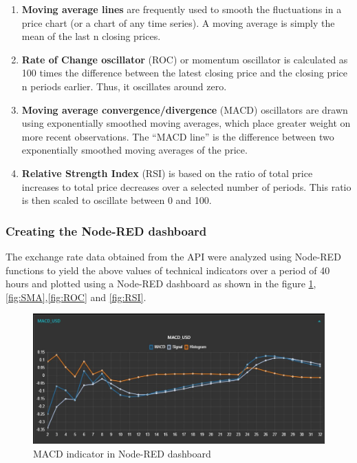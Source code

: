 \begin{enumerate}[itemsep=-1.7mm]
\item \textbf{Moving average lines} are frequently used to smooth the fluctuations in a price chart (or a chart of any time series). A moving average is simply the mean of the last n closing prices.

\item \textbf{Rate of Change oscillator} (ROC) or momentum oscillator is calculated as 100 times the difference between the latest closing price and the closing price n periods earlier. Thus, it oscillates around zero.

\item \textbf{Moving average convergence/divergence} (MACD) oscillators are drawn using exponentially smoothed moving averages, which place greater weight on more recent observations. The “MACD line” is the difference between two exponentially smoothed moving averages of the price.

\item \textbf{Relative Strength Index} (RSI) is based on the ratio of total price increases to total price decreases over a selected number of periods. This ratio is then scaled to oscillate between 0 and 100.
\end{enumerate}

\subsubsection{Creating the Node-RED dashboard}

The exchange rate data obtained from the API were analyzed using Node-RED functions to yield the above values of technical indicators over a period of 40 hours and plotted using a Node-RED dashboard as shown in the figure \ref{fig:MACD},\ref{fig:SMA},\ref{fig:ROC} and \ref{fig:RSI}.

\begin{figure}[H]
    \centering
      \includegraphics[width=1\textwidth]{images/MACD.jpg}
    \caption{MACD indicator in Node-RED dashboard}
    \label{fig:MACD}
\end{figure}

